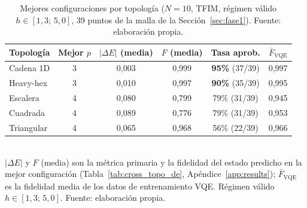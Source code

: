 \documentclass[11pt,a4paper,spanish]{book}
\begin{document}
\begin{table}[h]
\centering
\caption[Mejores configuraciones por topología ($N = 10$)]{Mejores configuraciones por topología ($N = 10$, TFIM, régimen válido $h \in [1{,}3;\, 5{,}0]$, 39 puntos de la malla de la Sección~\ref{sec:fase1}). Fuente: elaboración propia.}
\label{tab:cross_topo}
\begin{tabular}{lccccc}
\toprule
\textbf{Topología} & \textbf{Mejor $p$} & \textbf{$|\Delta E|$ (media)} & \textbf{$F$ (media)} & \textbf{Tasa aprob.} & \textbf{$\bar{F}_{\text{VQE}}$} \\
\midrule
Cadena 1D & 3 & 0,003 & 0,999 & \textbf{95\%} (37/39) & 0,997 \\
Heavy-hex & 3 & 0,010 & 0,997 & \textbf{90\%} (35/39) & 0,995 \\
Escalera & 4 & 0,080 & 0,799 & 79\% (31/39) & 0,945 \\
Cuadrada & 4 & 0,089 & 0,776 & 79\% (31/39) & 0,953 \\
Triangular & 4 & 0,065 & 0,968 & 56\% (22/39) & 0,966 \\
\bottomrule
\end{tabular}
\\[2pt]
\footnotesize $|\Delta E|$ y $F$ (media) son la métrica primaria y la fidelidad del estado predicho en la mejor configuración (Tabla~\ref{tab:cross_topo_de}, Apéndice~\ref{app:results}); $\bar{F}_{\text{VQE}}$ es la fidelidad media de los datos de entrenamiento VQE. Régimen válido $h \in [1{,}3;\, 5{,}0]$. Fuente: elaboración propia.
\end{table}
\end{document}
